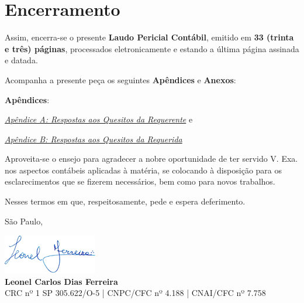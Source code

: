 \section{Encerramento}

Assim, encerra-se o presente \textbf{Laudo Pericial Contábil}, emitido em \textbf{33 (trinta e três) páginas}, processados eletronicamente e estando a última página assinada e datada.

Acompanha a presente peça os seguintes \textbf{Apêndices} e \textbf{Anexos}:

\textbf{Apêndices}:

\hyperlink{apA}{\emph{Apêndice A:	Respostas aos Quesitos da Requerente}} e

\hyperlink{ApB}{\emph{Apêndice B:	Respostas aos Quesitos da Requerida}}


Aproveita-se o ensejo para agradecer a nobre oportunidade de ter servido V. Exa. nos aspectos contábeis aplicadas à matéria, se colocando à disposição para os esclarecimentos que se fizerem necessários, bem como para novos trabalhos.


Nesses termos em que, respeitosamente, pede e espera deferimento.

\centering

São Paulo, \dataprot

\includegraphics[]{Imagens/Assinatura Leonel.png}\\
\textbf{Leonel Carlos Dias Ferreira}\\
CRC nº 1 SP 305.622/O-5 | CNPC/CFC nº 4.188 | CNAI/CFC nº 7.758